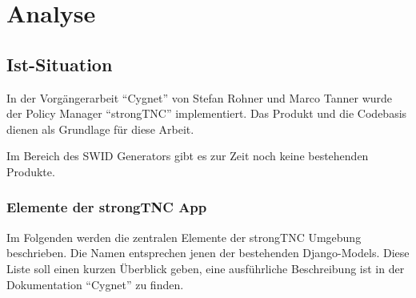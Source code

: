 \chapter{Analyse}

\section{Ist-Situation}

In der Vorgängerarbeit \enquote{Cygnet} von Stefan Rohner und Marco
Tanner\cite{cygnet:2013} wurde der Policy Manager \enquote{strongTNC}
implementiert. Das Produkt und die Codebasis dienen als Grundlage
für diese Arbeit.

Im Bereich des SWID Generators gibt es zur Zeit noch keine bestehenden Produkte.

\subsection{Elemente der strongTNC App}
Im Folgenden werden die zentralen Elemente der strongTNC Umgebung beschrieben.
Die Namen entsprechen jenen der bestehenden Django-Models. Diese Liste soll einen
kurzen Überblick geben, eine ausführliche Beschreibung ist in der Dokumentation
\enquote{Cygnet}\cite{cygnet:2013} zu finden.

